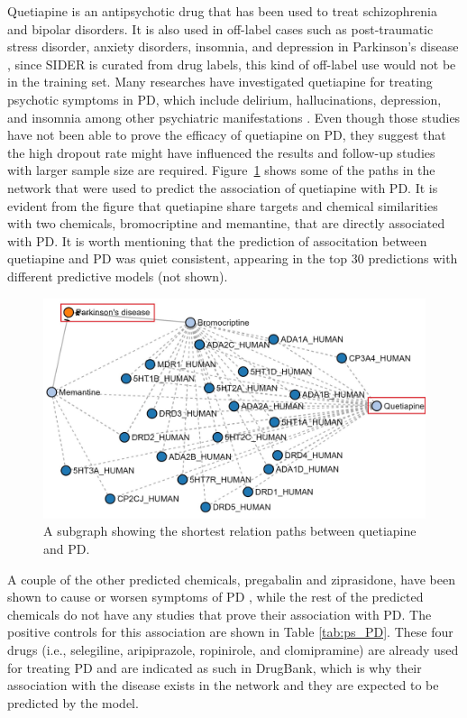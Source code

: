 Quetiapine is an antipsychotic drug that has been used to treat schizophrenia and bipolar disorders.
It is also used in off-label cases such as post-traumatic stress disorder, anxiety disorders, insomnia, and depression in Parkinson’s disease \cite{el-saifi_quetiapine_2016}, since SIDER is curated from drug labels, this kind of off-label use would not be in the training set.
Many researches have investigated quetiapine for treating psychotic symptoms in \ac{PD}, which include delirium, hallucinations, depression, and insomnia among other psychiatric manifestations \cite{desmarais_quetiapine_2016}.
Even though those studies have not been able to prove the efficacy of quetiapine on \ac{PD}, they suggest that the high dropout rate might have influenced the results and follow-up studies with larger sample size are required.
Figure~\ref{fig:parkinson_quetiapine} shows some of the paths in the network that were used to predict the association of quetiapine with \ac{PD}.
It is evident from the figure that quetiapine share targets and chemical similarities with two chemicals, bromocriptine and memantine, that are directly associated with \ac{PD}.
It is worth mentioning that the prediction of associtation between quetiapine and \ac{PD} was quiet consistent, appearing in the top 30 predictions with different predictive models (not shown).

\begin{figure}[h!]
    \centering
    \includegraphics[scale=0.6]
    {figures/parkinson_quetiapine.jpg}
    \caption[Quetiapine-PD path subgraph]{\label{fig:parkinson_quetiapine} A subgraph showing the shortest relation paths between quetiapine and \ac{PD}.}
\end{figure}

A couple of the other predicted chemicals, pregabalin and ziprasidone, have been shown to cause or worsen symptoms of \ac{PD} \cite{perez_lloret_pregabalin-induced_2009, younce_systematic_2019}, while the rest of the predicted chemicals do not have any studies that prove their association with \ac{PD}.
The positive controls for this association are shown in Table \ref{tab:ps_PD}.
These four drugs (i.e., selegiline, aripiprazole, ropinirole, and clomipramine) are already used for treating \ac{PD} and are indicated as such in DrugBank, which is why their association with the disease exists in the network and they are expected to be predicted by the model.

